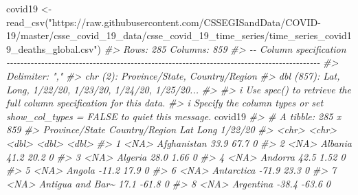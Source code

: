 \documentclass[
]{book}
\newenvironment{Shaded}{\begin{snugshade}}{\end{snugshade}}
\newcommand{\CommentTok}[1]{\textcolor[rgb]{0.56,0.35,0.01}{\textit{#1}}}
\newcommand{\FunctionTok}[1]{\textcolor[rgb]{0.00,0.00,0.00}{#1}}
\newcommand{\NormalTok}[1]{#1}
\newcommand{\OtherTok}[1]{\textcolor[rgb]{0.56,0.35,0.01}{#1}}
\newcommand{\StringTok}[1]{\textcolor[rgb]{0.31,0.60,0.02}{#1}}
\begin{document}
\begin{Shaded}
\begin{Highlighting}[]
\NormalTok{covid19 }\OtherTok{\textless{}{-}} \FunctionTok{read\_csv}\NormalTok{(}\StringTok{"https://raw.githubusercontent.com/CSSEGISandData/COVID{-}19/master/csse\_covid\_19\_data/csse\_covid\_19\_time\_series/time\_series\_covid19\_deaths\_global.csv"}\NormalTok{)}
\CommentTok{\#\textgreater{} Rows: 285 Columns: 859}
\CommentTok{\#\textgreater{} {-}{-} Column specification {-}{-}{-}{-}{-}{-}{-}{-}{-}{-}{-}{-}{-}{-}{-}{-}{-}{-}{-}{-}{-}{-}{-}{-}{-}{-}{-}{-}{-}{-}{-}{-}{-}{-}{-}{-}{-}{-}{-}{-}{-}{-}{-}{-}{-}{-}{-}{-}{-}{-}{-}{-}{-}{-}{-}{-}{-}{-}{-}{-}{-}{-}{-}{-}{-}{-}{-}{-}{-}{-}{-}{-}{-}{-}{-}{-}{-}{-}{-}{-}{-}{-}{-}{-}{-}{-}{-}{-}{-}{-}{-}}
\CommentTok{\#\textgreater{} Delimiter: ","}
\CommentTok{\#\textgreater{} chr   (2): Province/State, Country/Region}
\CommentTok{\#\textgreater{} dbl (857): Lat, Long, 1/22/20, 1/23/20, 1/24/20, 1/25/20...}
\CommentTok{\#\textgreater{} }
\CommentTok{\#\textgreater{} i Use \textasciigrave{}spec()\textasciigrave{} to retrieve the full column specification for this data.}
\CommentTok{\#\textgreater{} i Specify the column types or set \textasciigrave{}show\_col\_types = FALSE\textasciigrave{} to quiet this message.}
\NormalTok{covid19}
\CommentTok{\#\textgreater{} \# A tibble: 285 x 859}
\CommentTok{\#\textgreater{}    \textasciigrave{}Province/State\textasciigrave{}  \textasciigrave{}Country/Region\textasciigrave{}   Lat   Long \textasciigrave{}1/22/20\textasciigrave{}}
\CommentTok{\#\textgreater{}    \textless{}chr\textgreater{}             \textless{}chr\textgreater{}            \textless{}dbl\textgreater{}  \textless{}dbl\textgreater{}     \textless{}dbl\textgreater{}}
\CommentTok{\#\textgreater{}  1 \textless{}NA\textgreater{}              Afghanistan       33.9  67.7          0}
\CommentTok{\#\textgreater{}  2 \textless{}NA\textgreater{}              Albania           41.2  20.2          0}
\CommentTok{\#\textgreater{}  3 \textless{}NA\textgreater{}              Algeria           28.0   1.66         0}
\CommentTok{\#\textgreater{}  4 \textless{}NA\textgreater{}              Andorra           42.5   1.52         0}
\CommentTok{\#\textgreater{}  5 \textless{}NA\textgreater{}              Angola           {-}11.2  17.9          0}
\CommentTok{\#\textgreater{}  6 \textless{}NA\textgreater{}              Antarctica       {-}71.9  23.3          0}
\CommentTok{\#\textgreater{}  7 \textless{}NA\textgreater{}              Antigua and Bar\textasciitilde{}  17.1 {-}61.8          0}
\CommentTok{\#\textgreater{}  8 \textless{}NA\textgreater{}              Argentina        {-}38.4 {-}63.6          0}

\end{Highlighting}
\end{Shaded}
\end{document}
